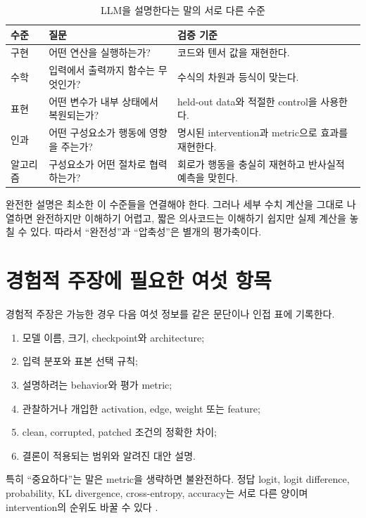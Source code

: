 \begin{table}[htbp]
\centering
\caption{LLM을 설명한다는 말의 서로 다른 수준}
\label{tab:levels-of-explanation}
\begin{tabularx}{\textwidth}{@{}p{}YY@{}}
\toprule
수준 & 질문 & 검증 기준 \\
\midrule
구현 & 어떤 연산을 실행하는가? & 코드와 텐서 값을 재현한다. \\
수학 & 입력에서 출력까지 함수는 무엇인가? & 수식의 차원과 등식이 맞는다. \\
표현 & 어떤 변수가 내부 상태에서 복원되는가? & held-out data와 적절한 control을 사용한다. \\
인과 & 어떤 구성요소가 행동에 영향을 주는가? & 명시된 intervention과 metric으로 효과를 재현한다. \\
알고리즘 & 구성요소가 어떤 절차로 협력하는가? & 회로가 행동을 충실히 재현하고 반사실적 예측을 맞힌다. \\
\bottomrule
\end{tabularx}
\end{table}

완전한 설명은 최소한 이 수준들을 연결해야 한다.
그러나 세부 수치 계산을 그대로 나열하면 완전하지만 이해하기 어렵고, 짧은 의사코드는 이해하기 쉽지만 실제 계산을 놓칠 수 있다.
따라서 ``완전성''과 ``압축성''은 별개의 평가축이다.

\section*{경험적 주장에 필요한 여섯 항목}

경험적 주장은 가능한 경우 다음 여섯 정보를 같은 문단이나 인접 표에 기록한다.

\begin{enumerate}
  \item 모델 이름, 크기, checkpoint와 architecture;
  \item 입력 분포와 표본 선택 규칙;
  \item 설명하려는 behavior와 평가 metric;
  \item 관찰하거나 개입한 activation, edge, weight 또는 feature;
  \item clean, corrupted, patched 조건의 정확한 차이;
  \item 결론이 적용되는 범위와 알려진 대안 설명.
\end{enumerate}

특히 ``중요하다''는 말은 metric을 생략하면 불완전하다.
정답 logit, logit difference, probability, KL divergence, cross-entropy, accuracy는 서로 다른 양이며 intervention의 순위도 바꿀 수 있다 \citep{zhang2024activation,miller2024faithfulness}.

